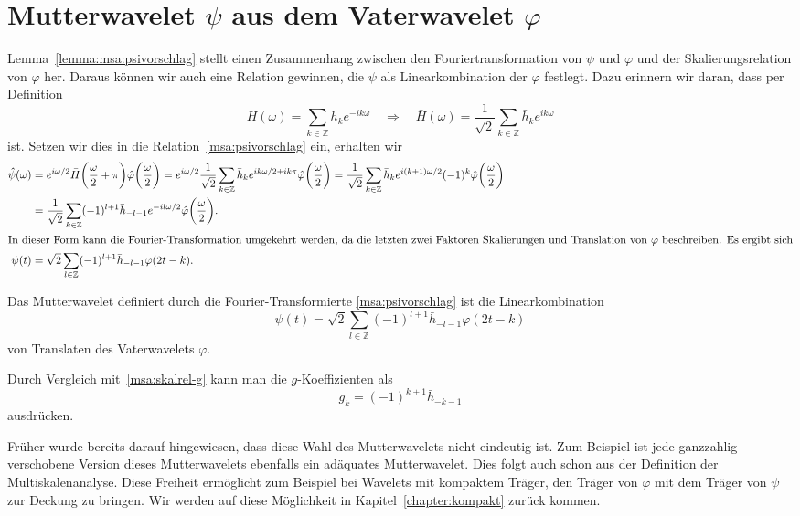 %
%
%
\section{Mutterwavelet $\psi$ aus dem Vaterwavelet $\varphi$
\label{section:mutter-aus-vater}}
Lemma~\ref{lemma:msa:psivorschlag} stellt einen Zusammenhang zwischen
den Fouriertransformation von $\psi$ und $\varphi$ und der Skalierungsrelation
von $\varphi$ her.
Daraus können wir auch eine Relation gewinnen, die $\psi$ als
Linearkombination der $\varphi$ festlegt.
Dazu erinnern wir daran, dass per Definition
\[
H(\omega) = \sum_{k\in\mathbb Z} h_k e^{-ik\omega} 
\quad\Rightarrow\quad
\bar{H}(\omega)
=
\frac{1}{\sqrt{2}}
\sum_{k\in\mathbb Z} \bar{h}_k e^{ik\omega} 
\]
ist.
Setzen wir dies in die Relation~\eqref{msa:psivorschlag} ein, erhalten wir
\begin{align*}
\hat{\psi}(\omega)
&=
e^{i\omega/2}
\bar{H}\biggl(\frac{\omega}2+\pi\biggr)
\hat{\varphi}\biggl(\frac{\omega}2\biggr)
=
e^{i\omega/2}
\frac{1}{\sqrt{2}}
\sum_{k\in\mathbb Z} \bar{h}_k e^{ik\omega/2 + ik\pi} 
\hat{\varphi}\biggl(\frac{\omega}2\biggr)
=
\frac{1}{\sqrt{2}}
\sum_{k\in\mathbb Z} \bar{h}_k e^{i(k+1)\omega/2} (-1)^k
\hat{\varphi}\biggl(\frac{\omega}2\biggr)
\\
&=
\frac{1}{\sqrt{2}}
\sum_{k\in\mathbb Z}
(-1)^{l+1}
\bar{h}_{-l-1} e^{-il\omega/2}
\hat{\varphi}\biggl(\frac{\omega}2\biggr).
\\
\intertext{In dieser Form kann die Fourier-Transformation umgekehrt werden,
da die letzten zwei Faktoren Skalierungen und Translation von $\varphi$
beschreiben.
Es ergibt sich}
\psi(t)
&=
\sqrt{2}\sum_{l\in\mathbb Z} (-1)^{l+1}\bar{h}_{-l-1} \varphi(2t-k).
\end{align*}

\begin{lemma}
\label{lemma:msa:psirelation}
Das Mutterwavelet definiert durch die Fourier-Transformierte
\eqref{msa:psivorschlag}
ist die Linearkombination
\begin{equation}
\psi(t)
=
\sqrt{2}\sum_{l\in\mathbb Z} (-1)^{l+1}\bar{h}_{-l-1} \varphi(2t-k)
\end{equation}
von Translaten des Vaterwavelets $\varphi$.
\end{lemma}

Durch Vergleich mit~\eqref{msa:skalrel-g} kann man die $g$-Koeffizienten als
\[
g_k = (-1)^{k+1} \bar{h}_{-k-1}
\]
ausdrücken.

Früher wurde bereits darauf hingewiesen, dass diese Wahl des Mutterwavelets
nicht eindeutig ist.
Zum Beispiel ist jede ganzzahlig verschobene Version dieses Mutterwavelets
ebenfalls ein adäquates Mutterwavelet.
Dies folgt auch schon aus der Definition der Multiskalenanalyse.
Diese Freiheit ermöglicht zum Beispiel bei Wavelets mit kompaktem Träger,
den Träger von $\varphi$ mit dem Träger von $\psi$ zur Deckung zu
bringen.
Wir werden auf diese Möglichkeit in Kapitel~\ref{chapter:kompakt}
zurück kommen.


